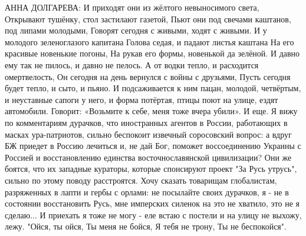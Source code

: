 АННА ДОЛГАРЕВА:
И приходят они из жёлтого невыносимого 
     света,  
Открывают тушёнку, стол застилают 
     газетой,  
Пьют они под свечами каштанов, под 
     липами молодыми,  
Говорят сегодня с живыми, ходят с 
     живыми.  
И у молодого зеленоглазого капитана  
Голова седая, и падают листья каштана  
На его красивые новенькие погоны,  
На рукав его формы, новенькой да 
     зелёной.  
И давно ему так не пилось, и давно не 
     пелось.  
А от водки тепло, и расходится 
     омертвелость,  
Он сегодня на день вернулся с войны с 
     друзьями,  
Пусть сегодня будет тепло, и сыто, и 
     пьяно.  
И подсаживается к ним пацан, молодой, 
     четвёртым,  
и неуставные сапоги у него, и форма 
     потёртая,  
птицы поют на улице, ездят автомобили.  
Говорит: «Возьмите к себе, меня тоже 
     вчера убили».
И еще. Я  вижу по комментариям дурачков, что иностранных агентов в России, работающих в масках ура-патриотов, сильно беспокоит извечный соросовский вопрос: а вдруг БЖ приедет в Россию лечиться и, не дай Бог, поможет воссоединению Украины с Россией и восстановлению единства восточнославянской цивилизации? Они же боятся, что их западные кураторы, которые спонсируют проект "За Русь утрусь", сильно по этому поводу расстроятся. Хочу сказать товарищам глобалистам, разряженных в лапти и гербы с орлами: не посылайте своих дурачков, я - не в состоянии восстановить Русь, мне имперских силенок на это не хватило, это не я сделаю... И приехать я тоже не могу - еле встаю с постели и на улицу не выхожу, лежу. "Ойся, ты ойся, Ты меня не бойся, Я тебя не трону, Ты не беспокойся".
